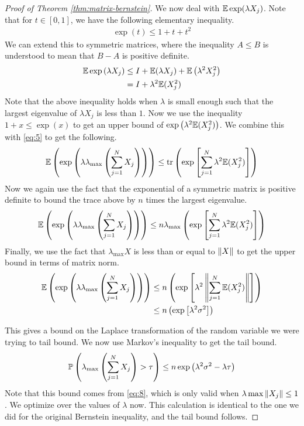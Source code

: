 \documentclass[11pt]{article}
\begin{document}
\begin{proof}[Proof of Theorem \ref{thm:matrix-bernstein}]
  We now deal with $\E \exp(\lambda X_j)$.
  Note that for $t \in [0, 1]$, we have the following elementary inequality.
  \begin{align*}
    \exp(t) \leq 1 + t + t^2
  \end{align*}
  We can extend this to symmetric matrices, where the inequality $A \leq B$ is understood to mean that $B-A$ is positive definite.
  \begin{align*}
    \E \exp\left( \lambda X_j \right) &\leq I + \E(\lambda X_j) + \E\left( \lambda^2 X_j^2 \right) \\
    &= I + \lambda^2 \E(X_j^2)
  \end{align*}
  Note that the above inequality holds when $\lambda$ is small enough such that the largest eigenvalue of $\lambda X_j$ is less than $1$.
  Now we use the inequality $1 + x \leq \exp(x)$ to get an upper bound of $\exp\left( \lambda^2 \E(X_j^2) \right)$.
  We combine this with \eqref{eq:5} to get the following.
  \begin{align}
    \label{eq:6}
    \E\left( \exp\left( \lambda \lambda_{\mathrm{max}} \left( \sum_{j=1}^N X_j \right) \right) \right)
    \leq \mathrm{tr} \left( \exp \left[ \sum_{j=1}^N \lambda^2 \E(X_j^2) \right] \right)
  \end{align}
  Now we again use the fact that the exponential of a symmetric matrix is positive definite to bound the trace above by $n$ times the largest eigenvalue.
  \begin{align}
    \label{eq:7}
     \E\left( \exp\left( \lambda \lambda_{\mathrm{max}} \left( \sum_{j=1}^N X_j \right) \right) \right)
    \leq n \lambda_{\mathrm{max}} \left( \exp \left[ \sum_{j=1}^N \lambda^2 \E(X_j^2) \right]\right)
  \end{align}
  Finally, we use the fact that $\lambda_{\mathrm{max}} X$ is less than or equal to $\norm{X}$ to get the upper bound in terms of matrix norm.
  \begin{align}
    \label{eq:8}
    \E\left( \exp\left( \lambda \lambda_{\mathrm{max}} \left( \sum_{j=1}^N X_j \right) \right) \right)
    &\leq n \left( \exp \left[ \lambda^2 \norm{\sum_{j=1}^N \E(X_j^2)}  \right]\right) \\
    &\leq n \left( \exp \left[ \lambda^2 \sigma^2  \right]\right)
  \end{align}

  This gives a bound on the Laplace transformation of the random variable we were trying to tail bound.
  We now use Markov's inequality to get the tail bound.
  \begin{align*}
    \P\left( \lambda_{\mathrm{max}} \left( \sum_{j=1}^N X_j\right) > \tau \right)
    \leq n \exp\left( \lambda^2 \sigma^2 - \lambda \tau \right)
  \end{align*}
  Note that this bound comes from \eqref{eq:8}, which is only valid when $\lambda \max \norm{X_j} \leq 1$.
  We optimize over the values of $\lambda$ now. This calculation is identical to the one we did for the original Bernstein inequality, and the tail bound follows.
\end{proof}
\end{document}
